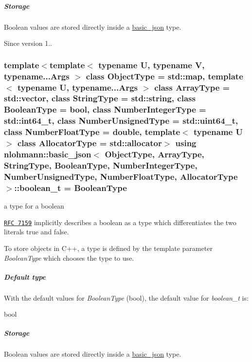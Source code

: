 \subparagraph*{Storage}

Boolean values are stored directly inside a \hyperlink{classnlohmann_1_1basic__json}{basic\-\_\-json} type.

\begin{DoxySince}{Since}
version 1.. 
\end{DoxySince}
\hypertarget{classnlohmann_1_1basic__json_af3bc3e83aa162d7ba4df16a949872723}{
\subsubsection[{boolean\-\_\-t}]{\setlength{\rightskip}{0pt plus 5cm}template$<$template$<$ typename U, typename V, typename...\-Args $>$ class Object\-Type = std\-::map, template$<$ typename U, typename...\-Args $>$ class Array\-Type = std\-::vector, class String\-Type  = std\-::string, class Boolean\-Type  = bool, class Number\-Integer\-Type  = std\-::int64\-\_\-t, class Number\-Unsigned\-Type  = std\-::uint64\-\_\-t, class Number\-Float\-Type  = double, template$<$ typename U $>$ class Allocator\-Type = std\-::allocator$>$ using {\bf nlohmann\-::basic\-\_\-json}$<$ Object\-Type, Array\-Type, String\-Type, Boolean\-Type, Number\-Integer\-Type, Number\-Unsigned\-Type, Number\-Float\-Type, Allocator\-Type $>$\-::{\bf boolean\-\_\-t} =  Boolean\-Type}}\label{classnlohmann_1_1basic__json_af3bc3e83aa162d7ba4df16a949872723}


a type for a boolean 

\href{http://rfc7159.net/rfc7159}{\tt R\-F\-C 7159} implicitly describes a boolean as a type which differentiates the two literals {\ttfamily true} and {\ttfamily false}.

To store objects in C++, a type is defined by the template parameter {\itshape Boolean\-Type} which chooses the type to use.

\subparagraph*{Default type}

With the default values for {\itshape Boolean\-Type} ({\ttfamily bool}), the default value for {\itshape boolean\-\_\-t} is\-:


\begin{DoxyCode}
\textcolor{keywordtype}{bool}
\end{DoxyCode}


\subparagraph*{Storage}

Boolean values are stored directly inside a \hyperlink{classnlohmann_1_1basic__json}{basic\-\_\-json} type.

